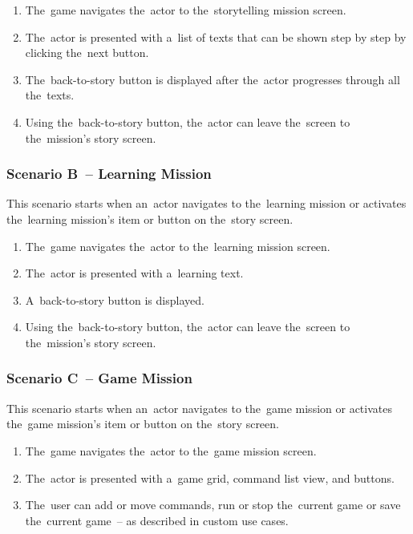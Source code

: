 \begin{enumerate}
    \item The~game navigates the~actor to the~storytelling mission screen.
    \item The~actor is presented with a~list of texts that can be shown step by step by clicking the~next button.
    \item The~back-to-story button is displayed after the~actor progresses through all the~texts.
    \item Using the~back-to-story button, the~actor can leave the~screen to the~mission's story screen.
\end{enumerate}

\subsubsection*{Scenario B~-- Learning Mission}

This scenario starts when an~actor navigates to the~learning mission or activates the~learning mission's item or button on the~story screen.

\begin{enumerate}
    \item The~game navigates the~actor to the~learning mission screen.
    \item The~actor is presented with a~learning text.
    \item A~back-to-story button is displayed.
    \item Using the~back-to-story button, the~actor can leave the~screen to the~mission's story screen.
\end{enumerate}

\subsubsection*{Scenario C~-- Game Mission}

This scenario starts when an~actor navigates to the~game mission or activates the~game mission's item or button on the~story screen.

\begin{enumerate}
    \item The~game navigates the~actor to the~game mission screen.
    \item The~actor is presented with a~game grid, command list view, and buttons.
    \item The~user can add or move commands, run or stop the~current game or save the~current game~-- as described in custom use cases.
\end{enumerate}

